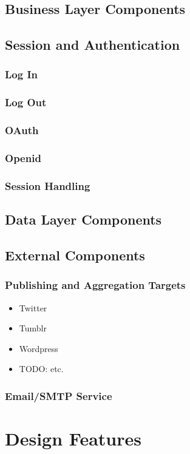 \documentclass{article}
\begin{document}
\subsection{Business Layer Components}
\subsection{Session and Authentication}
\subsubsection{Log In}
\subsubsection{Log Out}
\subsubsection{OAuth}
\subsubsection{Openid}
\subsubsection{Session Handling}
\subsection{Data Layer Components}
\subsection{External Components}
\subsubsection{Publishing and Aggregation Targets}
\begin{itemize}
\item Twitter
\item Tumblr
\item Wordpress
\item TODO: etc.
\end{itemize}
\subsubsection{Email/SMTP Service}
\section{Design Features}
\end{document}
